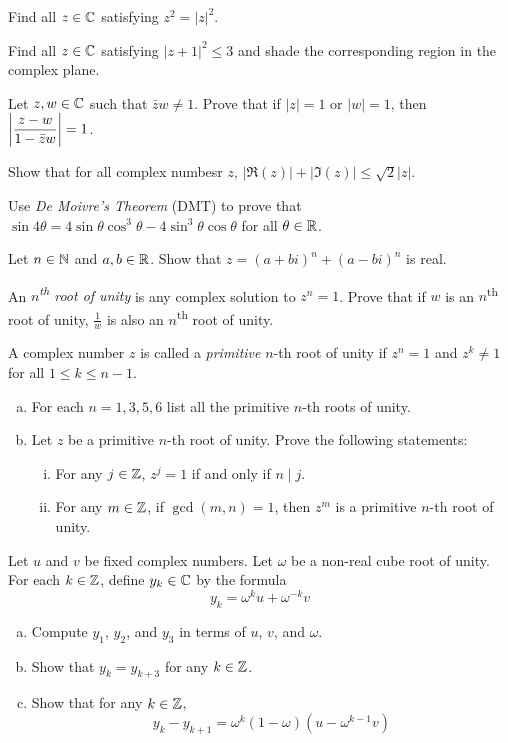 \question Find all $z\in\mathbb{C}$ satisfying $z^2=|z|^2$.

\question Find all $z\in\mathbb{C}$ satisfying $|z+1|^2 \leq 3$ and shade the corresponding region in the complex plane.

\question Let $z,w\in\mathbb{C}$ such that $\bar z w \neq 1$.
Prove that if $|z|=1$ or $|w|=1$, then $\abs{\dfrac{z-w}{1 -\bar z w}}=1$.

\question Show that for all complex numbesr $z$, $|\Re(z)|+|\Im(z)|\leq\sqrt{2}|z|$.

\question Use \emph{De Moivre's Theorem} (DMT) to prove that
$\sin 4\theta = 4\sin\theta\cos^3\theta - 4\sin^3\theta\cos\theta$ for all $\theta\in\mathbb{R}$.

\question Let $n\in\mathbb{N}$ and $a,b\in\mathbb{R}$. Show that $z=(a+bi)^n+(a-bi)^n$ is real.

\question An \emph{$n$\textsuperscript{th} root of unity} is any complex solution to $z^n=1$.
Prove that if $w$ is an $n$\textsuperscript{th} root of unity,
$\frac1w$ is also an $n$\textsuperscript{th} root of unity.

\question A complex number $z$ is called a \emph{primitive} $n$-th root of unity
if $z^n=1$ and $z^k \neq 1$ for all $1 \leq k \leq n-1$.
\begin{enumerate}[(a)]
  \item For each $n=1,3,5,6$ list all the primitive $n$-th roots of unity.
  \item Let $z$ be a primitive $n$-th root of unity. Prove the following statements:
        \begin{enumerate}[i.]
          \item For any $j\in\mathbb{Z}$, $z^j=1$ if and only if $n \mid j$.
          \item For any $m\in\mathbb{Z}$, if $\gcd(m,n)=1$, then $z^m$ is a primitive $n$-th root of unity.
        \end{enumerate}
\end{enumerate}

\question Let $u$ and $v$ be fixed complex numbers.
Let $\omega$ be a non-real cube root of unity.
For each $k\in\mathbb{Z}$, define $y_k\in\mathbb{C}$ by the formula \[ y_k = \omega^k u + \omega^{-k}v \]
\begin{enumerate}[(a)]
  \item Compute $y_1$, $y_2$, and $y_3$ in terms of $u$, $v$, and $\omega$.
  \item Show that $y_k = y_{k+3}$ for any $k\in\mathbb{Z}$.
  \item Show that for any $k\in\mathbb{Z}$, \[ y_k-y_{k+1} = \omega^k(1-\omega)(u-\omega^{k-1}v) \]
\end{enumerate}


